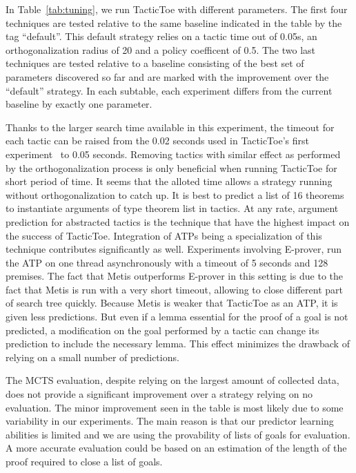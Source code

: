 \documentclass[runningheads,a4paper,draft]{svjour3}
\def\eprover{\textsf{E-prover}\xspace}
\def\metis{\textsf{Metis}\xspace}
\def\tactictoe{\textsf{TacticToe}\xspace}
\begin{document}
In Table~\ref{tab:tuning}, we run \tactictoe with different parameters.
The first four techniques are tested relative to the same baseline indicated in
the table by the tag ``default''.  This default strategy relies on a tactic
time out of 0.05s, an orthogonalization radius of 20 and a policy coefficent of
0.5.
The two last techniques are tested relative
to a baseline consisting of the best set of parameters discovered so far and
are marked with the improvement over the ``default'' strategy.
In each subtable, each experiment differs from the current baseline by exactly
one parameter.

Thanks to the larger search time available in this experiment, the timeout for
each tactic can be raised from the 0.02 seconds used in \tactictoe's first
experiment~\cite{tgckju-lpar17} to 0.05
seconds. Removing tactics with similar effect as performed by the
orthogonalization process is only beneficial when running \tactictoe for short
period of time. It seems that the alloted time allows a strategy
running without orthogonalization to catch up.
It is best to predict a list of 16 theorems to instantiate arguments of type
theorem list in tactics. At any rate, argument prediction for abstracted
tactics is the technique that have the highest impact on the success of
\tactictoe. Integration of ATPs being a specialization of this technique
contributes significantly as well. Experiments involving \eprover, run the ATP
on one thread asynchronously with a timeout of 5 seconds and 128 premises.
The fact that \metis outperforms \eprover in this setting is due to the fact
that \metis is run with a very short timeout, allowing to close different part
of search tree quickly. Because \metis is weaker that \tactictoe as an ATP, it
is given less predictions. But even if a lemma essential for the proof of a
goal is not predicted, a modification on the goal performed by a tactic can
change its prediction to include the necessary lemma.
This effect minimizes the drawback of relying on a small number of predictions.


The MCTS evaluation, despite relying on the largest amount of collected data,
does not provide a significant improvement over a strategy relying on no
evaluation. The minor improvement seen in the table is most likely due to some
variability in our experiments.
The main reason is that our predictor learning abilities is
limited and we are using the provability of lists of goals for evaluation. A
more accurate evaluation could be based on an estimation of the length of the
proof required to close a list of goals.
\end{document}
